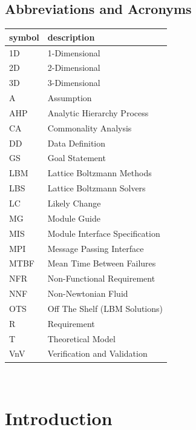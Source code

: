 \documentclass[12pt]{article}
\begin{document}
\subsection{Abbreviations and Acronyms}

\renewcommand{\arraystretch}{1.2}
\begin{tabular}{l l} 
  \toprule		
  \textbf{symbol} & \textbf{description}\\
  \midrule
  1D & 1-Dimensional\\ 
  2D & 2-Dimensional\\ 
  3D & 3-Dimensional\\ 
  A & Assumption\\
  AHP & Analytic Hierarchy Process\\
  CA & Commonality Analysis\\
  DD & Data Definition\\
  GS & Goal Statement\\
  LBM & Lattice Boltzmann Methods\\
  LBS & Lattice Boltzmann Solvers\\
  LC & Likely Change\\
  MG & Module Guide\\
  MIS & Module Interface Specification\\
  MPI & Message Passing Interface\\
  MTBF & Mean Time Between Failures\\
  NFR & Non-Functional Requirement\\
  NNF & Non-Newtonian Fluid\\
  OTS & Off The Shelf (LBM Solutions)\\
  R & Requirement\\
  T & Theoretical Model\\
  VnV & Verification and Validation\\
  \bottomrule
\end{tabular}\\

\newpage

\tableofcontents

\newpage
\section{Introduction}
\end{document}
